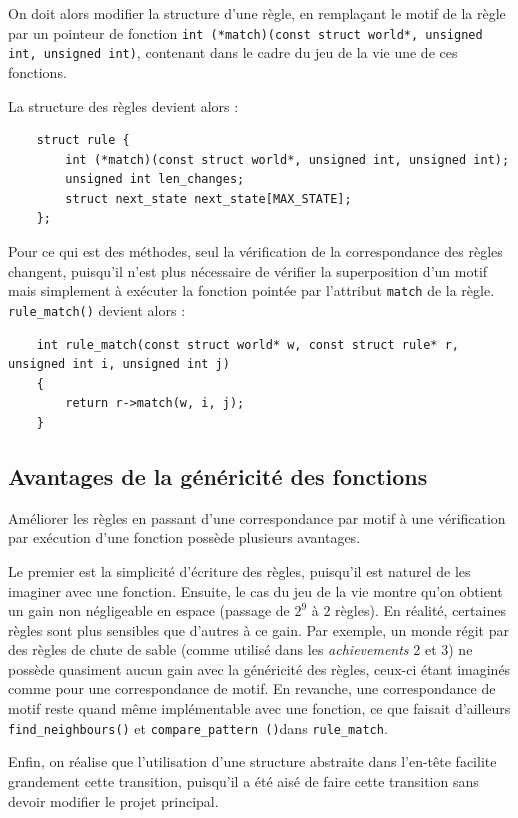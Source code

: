 On doit alors modifier la structure d'une règle, en remplaçant le motif de la règle par un pointeur de fonction \lstinline{int (*match)(const struct world*, unsigned int, unsigned int)}, contenant dans le cadre du jeu de la vie une de ces fonctions.

La structure des règles devient alors :
\begin{lstlisting}
    struct rule {
        int (*match)(const struct world*, unsigned int, unsigned int);
        unsigned int len_changes;
        struct next_state next_state[MAX_STATE];
    };
\end{lstlisting}

Pour ce qui est des méthodes, seul la vérification de la correspondance des règles changent, puisqu'il n'est plus nécessaire de vérifier la superposition d'un motif mais simplement à exécuter la fonction pointée par l'attribut \lstinline{match} de la règle. \lstinline{rule_match()} devient alors :
\begin{lstlisting}
    int rule_match(const struct world* w, const struct rule* r, unsigned int i, unsigned int j)
    {   
        return r->match(w, i, j);
    }
\end{lstlisting}

\subsection{Avantages de la généricité des fonctions}
Améliorer les règles en passant d'une correspondance par motif à une vérification par exécution d'une fonction possède plusieurs avantages.

Le premier est la simplicité d'écriture des règles, puisqu'il est naturel de les imaginer avec une fonction. Ensuite, le cas du jeu de la vie montre qu'on obtient un gain non négligeable en espace (passage de $2^9$ à $2$ règles). En réalité, certaines règles sont plus sensibles que d'autres à ce gain. Par exemple, un monde régit par des règles de chute de sable (comme utilisé dans les \emph{achievements} 2 et 3) ne possède quasiment aucun gain avec la généricité des règles, ceux-ci étant imaginés comme pour une correspondance de motif. En revanche, une correspondance de motif reste quand même implémentable avec une fonction, ce que faisait d'ailleurs \lstinline{find_neighbours()} et \lstinline{compare_pattern ()}dans \lstinline{rule_match}.

Enfin, on réalise que l'utilisation d'une structure abstraite dans l'en-tête facilite grandement cette transition, puisqu'il a été aisé de faire cette transition sans devoir modifier le projet principal.